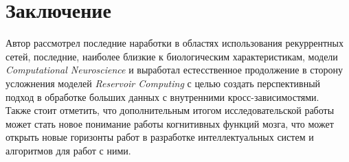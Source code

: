 \documentclass[a4paper,10pt]{article}
\begin{document}
\section{Заключение}
Автор рассмотрел последние наработки в областях использования рекуррентных сетей, последние, наиболее близкие к биологическим характеристикам, модели \textit{Computational Neuroscience} и выработал естесственное продолжение в сторону усложнения моделей \textit{Reservoir Computing} с целью создать перспективный подход в обработке больших данных с внутренними кросс-зависимостями.\\
\indent Также стоит отметить, что дополнительным итогом исследовательской работы может стать новое понимание работы когнитивных функций мозга, что может открыть новые горизонты работ в разработке интеллектуальных систем и алгоритмов для работ с ними.
\newpage
{}
\end{document}
